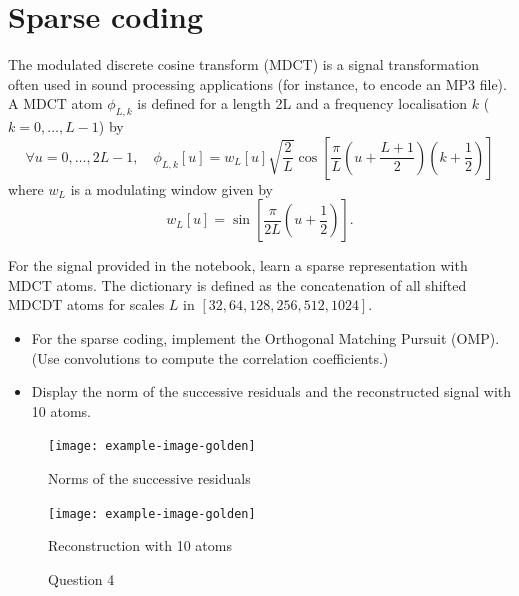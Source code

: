 \documentclass[11pt]{article}
\begin{document}
\newpage
\section{Sparse coding}

The modulated discrete cosine transform (MDCT) is a signal transformation often used in sound processing applications (for instance, to encode an MP3 file).
A MDCT atom $\phi_{L,k}$ is defined for a length 2L and a frequency localisation $k$ ($k=0,\dots,L-1$) by
\begin{equation}
\forall u=0,\dots,2L-1,\quad\phi_{L,k}[u]=w_{L}[u]\sqrt{\frac{2}{L}} \cos [ \frac{\pi}{L} \left(u+ \frac{L+1}{2}\right) (k+\frac{1}{2}) ]
\end{equation}
where $w_{L}$ is a modulating window given by
\begin{equation}
w_L[u] = \sin \left[{\frac {\pi }{2L}}\left(u+{\frac {1}{2}}\right)\right].
\end{equation}


\begin{exercise}[subtitle=Sparse coding with OMP]
For the signal provided in the notebook, learn a sparse representation with MDCT atoms.
The dictionary is defined as the concatenation of all shifted MDCDT atoms for scales $L$ in $[32, 64, 128, 256, 512, 1024]$.

\begin{itemize}
    \item For the sparse coding, implement the Orthogonal Matching Pursuit (OMP). (Use convolutions to compute the correlation coefficients.)
    \item Display the norm of the successive residuals and the reconstructed signal with 10 atoms.
\end{itemize}

\end{exercise}
\begin{solution}


\begin{figure}
    \centering
    \begin{minipage}[t]{0.45\textwidth}
    \centerline{\texttt{[image: example-image-golden]}}
    \centerline{Norms of the successive residuals}
    \end{minipage}
    \hfill
    \begin{minipage}[t]{0.45\textwidth}    \centerline{\texttt{[image: example-image-golden]}}
    \centerline{Reconstruction with 10 atoms}
    \end{minipage}
    \caption{Question 4}
\end{figure}



\end{solution}
\end{document}

